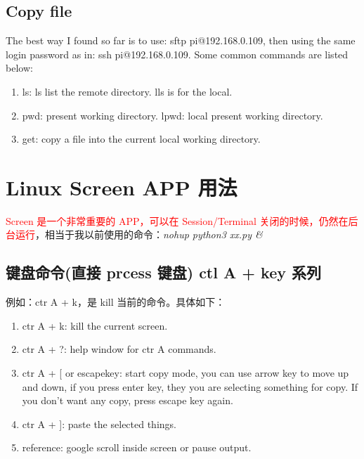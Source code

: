\documentclass[UTF8,fancyhdr,a4paper]{ctexart}
\newcommand{\pflred}[1]{\textcolor{red}{#1}}
\begin{document}
\subsection{Copy file}

The best way I found so far is to use: sftp pi@192.168.0.109, then using the same login password as in: ssh pi@192.168.0.109.
Some common commands are listed below:
\begin{enumerate}
      \item ls: ls list the remote directory. lls is for the local.
      \item pwd: present working directory. lpwd: local present working directory.
      \item get: copy a file into the current local working directory.

\end{enumerate}





\newpage

\section{Linux Screen APP 用法}
\pflred{Screen 是一个非常重要的 APP，可以在 Session/Terminal 关闭的时候，仍然在后台运行}，相当于我以前使用的命令：\textit{nohup python3 xx.py \&}
\subsection{键盘命令(直接 prcess 键盘) ctl A + key 系列}
例如：ctr A + k，是 kill 当前的命令。具体如下：
\begin{enumerate}
      \item ctr A + k: kill the current screen.
      \item ctr A + ?: help window for ctr A commands.
      \item ctr A + [ or escapekey: start copy mode, you can use arrow key to move up and down, if you press enter key, they you are selecting something for copy. If you don't want any copy, press escape key again.
      \item ctr A + ]: paste the selected things.
      \item reference: google scroll inside screen or pause output.
\end{enumerate}
\end{document}
